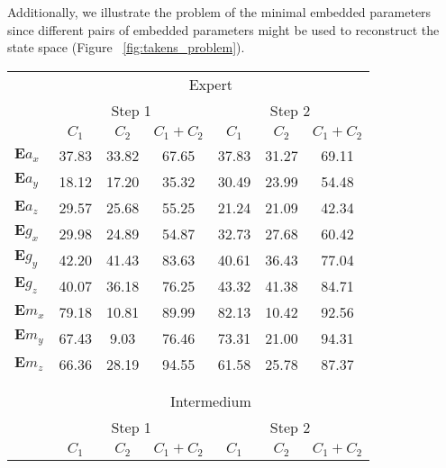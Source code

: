 \documentclass{sigchi}
\begin{document}
Additionally, we illustrate the problem of the minimal embedded parameters since 
different pairs of embedded parameters might be used to reconstruct the state space (Figure ~\ref{fig:takens_problem}). 



\begin{table}
\tiny
\centering
\begin{tabular}{l c c c c c c }
\toprule

& \multicolumn{6}{c}{Expert} \\
\cmidrule(r){2-7}

& \multicolumn{3}{c}{Step 1} & \multicolumn{3}{c}{Step 2}\\
\cmidrule(lr){2-4} \cmidrule(lr){5-7}

     & $C_1$  & $C_2$  & $C_1+C_2$  & $C_1$  & $C_2$  & $C_1+C_2$  \\
\midrule

$\boldsymbol{E} a_{x}$ & 37.83 & 33.82 & 67.65 & 37.83 & 31.27 & 69.11 \\
$\boldsymbol{E} a_{y}$ & 18.12 & 17.20 & 35.32 & 30.49 & 23.99 & 54.48 \\
$\boldsymbol{E} a_{z}$ & 29.57 & 25.68 & 55.25 & 21.24 & 21.09 & 42.34 \\
$\boldsymbol{E} g_{x}$ & 29.98 & 24.89 & 54.87 & 32.73 & 27.68 & 60.42 \\
$\boldsymbol{E} g_{y}$ & 42.20 & 41.43 & 83.63 & 40.61 & 36.43 & 77.04 \\
$\boldsymbol{E} g_{z}$ & 40.07 & 36.18 & 76.25 & 43.32 & 41.38 & 84.71 \\
$\boldsymbol{E} m_{x}$ & 79.18 & 10.81 & 89.99 & 82.13 & 10.42 & 92.56 \\
$\boldsymbol{E} m_{y}$ & 67.43 & 9.03 & 76.46 & 73.31 & 21.00 & \cellcolor{blue!25}94.31 \\
$\boldsymbol{E} m_{z}$ & 66.36 & 28.19 & \cellcolor{blue!25}94.55 & 61.58 & 25.78 & 87.37   \\

\\
\\
& \multicolumn{6}{c}{Intermedium} \\
\cmidrule(r){2-7}

& \multicolumn{3}{c}{Step 1} & \multicolumn{3}{c}{Step 2}\\
\cmidrule(lr){2-4} \cmidrule(lr){5-7}
     & $C_1$  & $C_2$  & $C_1+C_2$  & $C_1$  & $C_2$  & $C_1+C_2$  \\
\midrule


\end{tabular}
\end{table}
\end{document}
